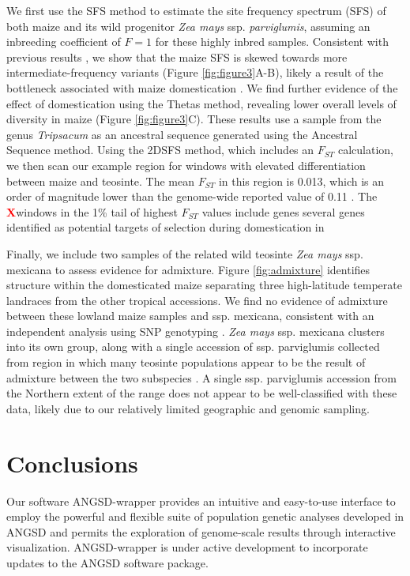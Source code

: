 \documentclass[10pt,a4paper]{article}
\newcommand{\fst}{${F_{ST}}$ }
\newcommand{\X}{\textcolor{red}{\bf X}}
\begin{document}
We first use the SFS method to estimate the site frequency spectrum (SFS) of both maize and its wild progenitor \textit{Zea mays} ssp. \textit{parviglumis}, assuming an inbreeding coefficient of $F=1$ for these highly inbred samples. 
Consistent with previous results \citep{hufford2012comparative}, we show that the maize SFS is skewed towards more intermediate-frequency variants (Figure \ref{fig:figure3}A-B), likely a result of the bottleneck associated with maize domestication \citep{Beissinger031666}.
We find further evidence of the effect of domestication using the Thetas method, revealing lower overall levels of diversity in maize (Figure \ref{fig:figure3}C). 
These results use a sample from the genus \textit{Tripsacum} as an ancestral sequence generated using the Ancestral Sequence method. 
Using the 2DSFS method, which includes an \fst calculation, we then scan our example region for windows with elevated differentiation between maize and teosinte. 
The mean \fst in this region is 0.013, which is an order of magnitude lower than the genome-wide reported value of 0.11 \citep{hufford2012comparative}.   
The \X windows in the 1\% tail of highest \fst values include genes several genes identified as potential targets of selection during domestication in \citep{hufford2012comparative} 

Finally, we include two samples of the related wild teosinte \textit{Zea mays} ssp. {mexicana} to assess evidence for admixture.  
Figure \ref{fig:admixture} identifies structure within the domesticated maize separating three high-latitude temperate landraces from the other tropical accessions. 
We find no evidence of admixture between these lowland maize samples and  ssp. {mexicana}, consistent with an independent analysis using SNP genotyping \citep{hufford2013genomic}.
\textit{Zea mays} ssp. {mexicana} clusters into its own group, along with a single accession of ssp. {parviglumis} collected from region in which many teosinte populations appear to be the result of admixture between the two subspecies \citep{fang2012megabase}.  
A single  ssp. {parviglumis} accession from the Northern extent of the range does not appear to be well-classified with these data, likely due to our relatively limited geographic and genomic sampling.

\section*{Conclusions}
Our software ANGSD-wrapper provides an intuitive and easy-to-use interface to employ the powerful and flexible suite of population genetic analyses developed in ANGSD \citep{korneliussen2014angsd} and permits the exploration of genome-scale results through interactive visualization.
ANGSD-wrapper is under active development to incorporate updates to the ANGSD software package.  
\end{document}
